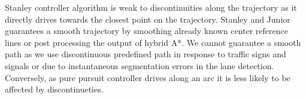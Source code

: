 Stanley controller algorithm is weak to discontinuities along the trajectory as
it directly drives towards the closest point on the trajectory. Stanley and
Junior guarantees a smooth trajectory by smoothing already known center
reference lines or post processing the output of hybrid A*. We cannot guarantee
a smooth path as we use discontinuous predefined path in response to traffic
signs and signals or due to instantaneous segmentation errors in the lane
detection.  Conversely, as pure pursuit controller drives along an arc it is
less likely to be affected by discontinueties.
